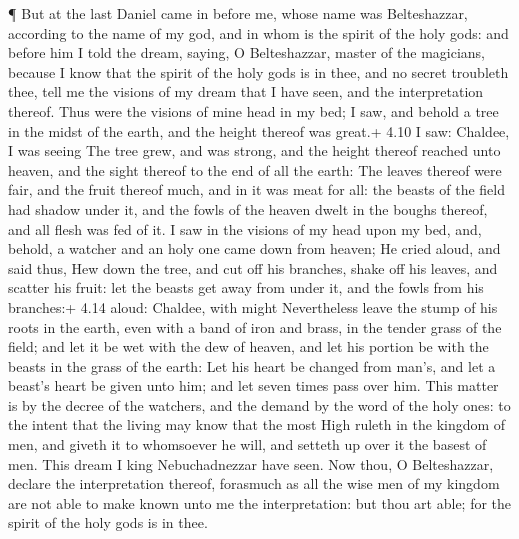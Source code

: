  ¶ But at the last Daniel came in before me, whose name was
Belteshazzar, according to the name of my god, and in whom is the spirit
of the holy gods: and before him I told the dream, saying, 
O Belteshazzar, master of the magicians, because I know that the spirit
of the holy gods is in thee, and no secret troubleth thee, tell me the
visions of my dream that I have seen, and the interpretation thereof.
 Thus were the visions of mine head in my bed; I saw, and
behold a tree in the midst of the earth, and the height thereof was
great.+ 4.10 I saw: Chaldee, I was seeing  The tree grew,
and was strong, and the height thereof reached unto heaven, and the
sight thereof to the end of all the earth:  The leaves
thereof were fair, and the fruit thereof much, and in it was meat for
all: the beasts of the field had shadow under it, and the fowls of the
heaven dwelt in the boughs thereof, and all flesh was fed of it.
 I saw in the visions of my head upon my bed, and, behold,
a watcher and an holy one came down from heaven;  He cried
aloud, and said thus, Hew down the tree, and cut off his branches, shake
off his leaves, and scatter his fruit: let the beasts get away from
under it, and the fowls from his branches:+ 4.14 aloud: Chaldee, with
might  Nevertheless leave the stump of his roots in the
earth, even with a band of iron and brass, in the tender grass of the
field; and let it be wet with the dew of heaven, and let his portion be
with the beasts in the grass of the earth:  Let his heart
be changed from man's, and let a beast's heart be given unto him; and
let seven times pass over him.  This matter is by the
decree of the watchers, and the demand by the word of the holy ones: to
the intent that the living may know that the most High ruleth in the
kingdom of men, and giveth it to whomsoever he will, and setteth up over
it the basest of men.  This dream I king Nebuchadnezzar
have seen. Now thou, O Belteshazzar, declare the interpretation thereof,
forasmuch as all the wise men of my kingdom are not able to make known
unto me the interpretation: but thou art able; for the spirit of the
holy gods is in thee.

